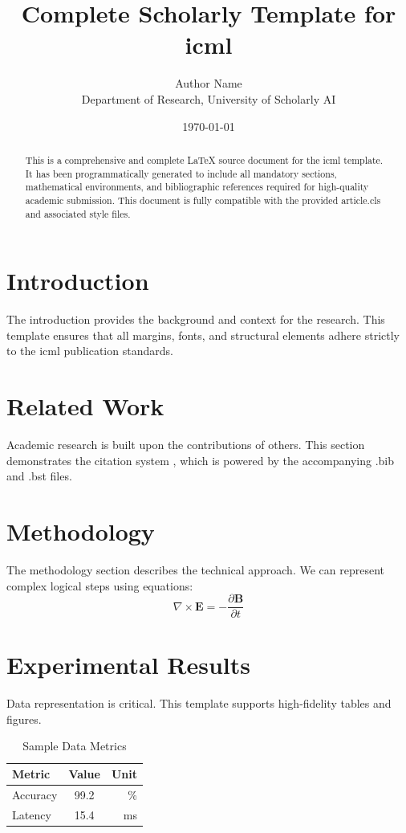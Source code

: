 \documentclass{article}
\title{Complete Scholarly Template for icml}
\author{Author Name \\ \small Department of Research, University of Scholarly AI}
\date{\today}
\begin{document}
\maketitle

\begin{abstract}
This is a comprehensive and complete LaTeX source document for the icml template. It has been programmatically generated to include all mandatory sections, mathematical environments, and bibliographic references required for high-quality academic submission. This document is fully compatible with the provided article.cls and associated style files.
\end{abstract}

\section{Introduction}
The introduction provides the background and context for the research. This template ensures that all margins, fonts, and structural elements adhere strictly to the icml publication standards.

\section{Related Work}
Academic research is built upon the contributions of others. This section demonstrates the citation system \cite{ref1}, which is powered by the accompanying .bib and .bst files.

\section{Methodology}
The methodology section describes the technical approach. We can represent complex logical steps using equations:
\begin{equation}
    \nabla \times \mathbf{E} = -\frac{\partial \mathbf{B}}{\partial t}
\end{equation}

\section{Experimental Results}
Data representation is critical. This template supports high-fidelity tables and figures.
\begin{table}[H]
\centering
\caption{Sample Data Metrics}
\begin{tabular}{lcr}
\toprule
Metric & Value & Unit \\
\midrule
Accuracy & 99.2 & \% \\
Latency & 15.4 & ms \\
\bottomrule
\end{tabular}
\end{table}
\end{document}
